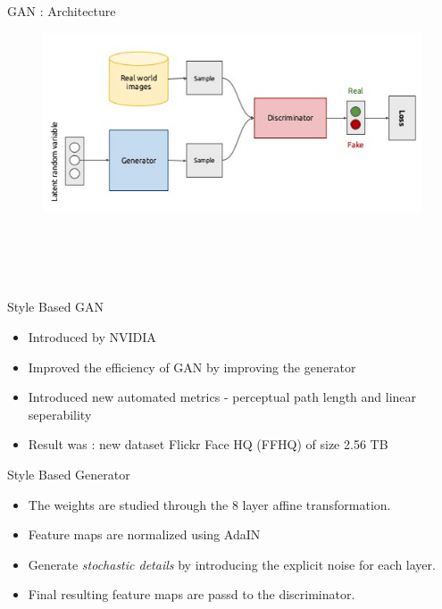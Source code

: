 \documentclass[10pt]{beamer}
\begin{document}
\begin{frame}[fragile]{GAN : Architecture}
     \begin{figure}[ht]
         \hspace*{-1cm}\includegraphics[width=0.7\linewidth]{ganarchitecture.png} \\ \\ \\ \\ \\ 
    \end{figure}
\end{frame}
\begin{frame}[fragile]{Style Based GAN}
        \begin{itemize}
        \item Introduced by NVIDIA 
        \item Improved the efficiency of GAN by improving the generator
        \item Introduced new automated metrics - perceptual path length and linear seperability
        \item Result was  : new dataset Flickr Face HQ (FFHQ) of size 2.56 TB
    \end{itemize}

\end{frame}

\begin{frame}[fragile]{Style Based Generator}
        \begin{itemize}
        \item The weights are studied through the 8 layer affine transformation.
        \item Feature maps are normalized using AdaIN
        \item Generate \textit{stochastic details} by introducing the explicit noise for each layer.
        \item Final resulting feature maps are passd to the discriminator.
    \end{itemize}

\end{frame}
\end{document}
